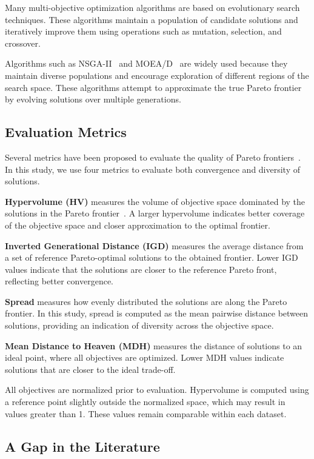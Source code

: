 \documentclass[sigconf,authorversion,nonacm]{acmart}
\begin{document}
Many multi-objective optimization algorithms are based on evolutionary 
search techniques. These algorithms maintain a population of candidate 
solutions and iteratively improve them using operations such as mutation, 
selection, and crossover.

Algorithms such as NSGA-II~\cite{deb2002nsga2} and MOEA/D~\cite{zhang2007moead} 
are widely used because they maintain diverse populations and encourage 
exploration of different regions of the search space. These algorithms attempt to approximate the 
true Pareto frontier by evolving solutions over multiple generations.


\subsection{Evaluation Metrics}

Several metrics have been proposed to evaluate the quality of Pareto 
frontiers~\cite{riquelme2015metrics,audet2021performance}. In this study, 
we use four metrics to evaluate both convergence and diversity of solutions.

\textbf{Hypervolume (HV)} measures the volume of objective space dominated 
by the solutions in the Pareto frontier~\cite{shang2020hypervolume}. A larger 
hypervolume indicates better coverage of the objective space and closer 
approximation to the optimal frontier.

\textbf{Inverted Generational Distance (IGD)} measures the average distance 
from a set of reference Pareto-optimal solutions to the obtained frontier. 
Lower IGD values indicate that the solutions are closer to the reference 
Pareto front, reflecting better convergence.

\textbf{Spread} measures how evenly distributed the solutions are along the 
Pareto frontier. In this study, spread is computed as the mean pairwise 
distance between solutions, providing an indication of diversity across 
the objective space.

\textbf{Mean Distance to Heaven (MDH)} measures the distance of solutions 
to an ideal point, where all objectives are optimized. Lower MDH values 
indicate solutions that are closer to the ideal trade-off.

All objectives are normalized prior to evaluation. Hypervolume is computed 
using a reference point slightly outside the normalized space, which may 
result in values greater than 1. These values remain comparable within 
each dataset.

\subsection{A Gap in the Literature}
\end{document}
